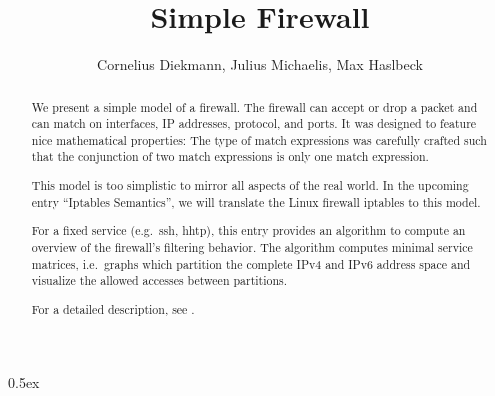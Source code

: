 \documentclass[11pt,a4paper]{article}
\begin{document}
\title{Simple Firewall}
\author{Cornelius Diekmann, Julius Michaelis, Max Haslbeck}
\maketitle

\begin{abstract}  
  We present a simple model of a firewall. 
  The firewall can accept or drop a packet and can match on interfaces, IP addresses, protocol, and ports. 
  It was designed to feature nice mathematical properties: 
  The type of match expressions was carefully crafted such that the conjunction of two match expressions is only one match expression. 
  
  This model is too simplistic to mirror all aspects of the real world. 
  In the upcoming entry ``Iptables Semantics'', we will translate the Linux firewall iptables to this model. 
  
  For a fixed service (e.g.\ ssh, hhtp), this entry provides an algorithm to compute an overview of the firewall's filtering behavior. 
  The algorithm computes minimal service matrices, i.e.\ graphs which partition the complete IPv4 and IPv6 address space and visualize the allowed accesses between partitions. 

For a detailed description, see \cite{diekmann2016networking}. 
\end{abstract}

\tableofcontents

\parindent 0pt\parskip 0.5ex





\end{document}
